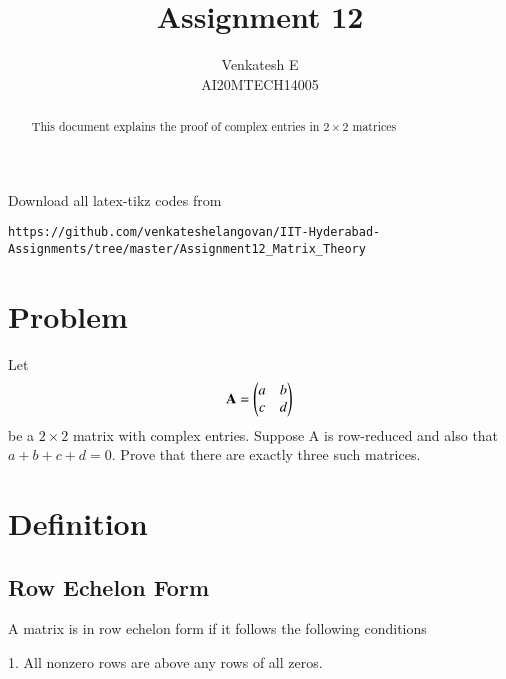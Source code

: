\documentclass[journal,12pt,twocolumn]{IEEEtran}
\begin{document}
\makeatletter
{}
\makeatother
\let\StandardTheFigure\thefigure
\let\vec\mathbf
\renewcommand{\thefigure}{\theproblem}
\def\putbox#1#2#3{\makebox[0in][l]{\makebox[#1][l]{}\raisebox{\baselineskip}[0in][0in]{\raisebox{#2}[0in][0in]{#3}}}}
     \def\rightbox#1{\makebox[0in][r]{#1}}
     \def\centbox#1{\makebox[0in]{#1}}
     \def\topbox#1{\raisebox{-\baselineskip}[0in][0in]{#1}}
     \def\midbox#1{\raisebox{-0.5\baselineskip}[0in][0in]{#1}}
\vspace{3cm}
\title{Assignment 12}
\author{Venkatesh E\\AI20MTECH14005}
\maketitle
\newpage
\bigskip
\renewcommand{\thefigure}{\theenumi}
\renewcommand{\thetable}{\theenumi}
\begin{abstract}
This document explains the proof of complex entries in $2\times2$ matrices 
\end{abstract}
Download all latex-tikz codes from 
%
\begin{lstlisting}
https://github.com/venkateshelangovan/IIT-Hyderabad-Assignments/tree/master/Assignment12_Matrix_Theory
\end{lstlisting}
\section{Problem}
Let
\begin{align}
    \vec{A}=\myvec{a & b\\c & d}
\end{align}
be a $2\times2$ matrix with complex entries. Suppose A is row-reduced and also that $a+b+c+d=0$. Prove that there are exactly three such matrices. 
\section{Definition}
\subsection{Row Echelon Form}
A matrix is in row echelon  form if it follows the following conditions

1. All nonzero rows are above any rows of all zeros.
\end{document}
